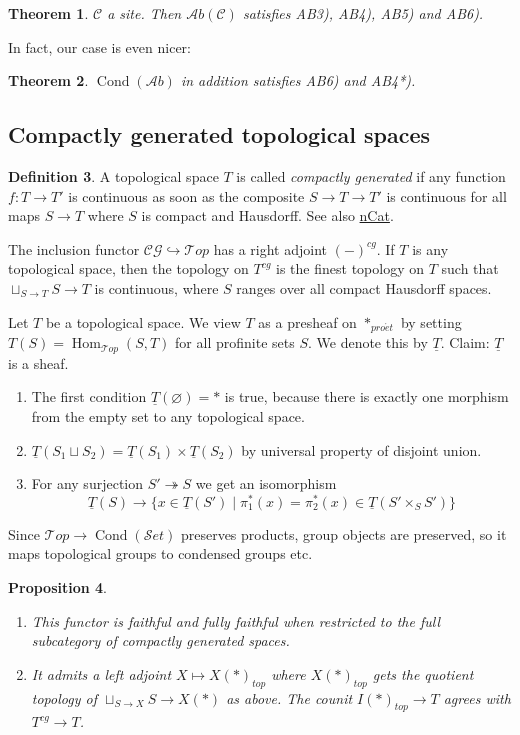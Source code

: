 \documentclass[11pt,A4]{article}
\theoremstyle{plain}
\newtheorem{thm}{Theorem}[section]
\newtheorem{prop}[thm]{Proposition}
\theoremstyle{definition}
\newtheorem{defn}[thm]{Definition}
\theoremstyle{remark}
\newcommand{\1}{\mathbbm{1}}
\newcommand{\scrC}{\mathscr{C}}
\newcommand{\Top}{\mathscr{T}op}
\newcommand{\CG}{\mathscr{CG}}
\newcommand{\Ab}{\mathscr{A}b}
\newcommand{\Set}{\mathscr{S}et}
\DeclareMathOperator{\Hom}{Hom}
\DeclareMathOperator{\Cond}{Cond}
\newcommand{\pe}{*_{pro\acute et}}
\renewcommand{\u}[1]{\underline{#1}}
\newcommand{\fp}[1]{\times_{#1}}
\begin{document}
\begin{thm}
    $\scrC$ a site. Then $\Ab(\scrC)$ satisfies AB3), AB4), AB5) and AB6).
\end{thm}

In fact, our case is even nicer:

\begin{thm}
    $\Cond(\Ab)$ in addition satisfies AB6) and AB4*).
\end{thm}

\subsection{Compactly generated topological spaces}

\begin{defn}
    A topological space $T$ is called \textit{compactly generated} if any function $f\colon T\to T'$ is continuous as soon as the composite $S\to T\to T'$ is continuous for all maps $S\to T$ where $S$ is compact and Hausdorff.
    See also \href{https://ncatlab.org/nlab/show/compactly+generated+topological+space}{nCat}.
\end{defn}

The inclusion functor $\CG \hookrightarrow \Top$ has a right adjoint $(-)^{cg}$.
If $T$ is any topological space, then the topology on $T^{cg}$ is the finest topology on $T$ such that $\sqcup_{S\to T}S\to T$ is continuous, where $S$ ranges over all compact Hausdorff spaces.

Let $T$ be a topological space.
We view $T$ as a presheaf on $\pe$ by setting $T(S)=\Hom_{\Top}(S,T)$ for all profinite sets $S$.
We denote this by $\u{T}$.
Claim: $\u{T}$ is a sheaf.
\begin{enumerate}[label=\roman*)]
    \item The first condition $\u{T}(\varnothing)=*$ is true, because there is exactly one morphism from the empty set to any topological space.
    \item $\u{T}(S_{1}\sqcup S_{2})=\u{T}(S_{1})\times \u{T}(S_{2})$ by universal property of disjoint union.
    \item For any surjection $S'\twoheadrightarrow S$ we get an isomorphism
	\[ \u{T}(S)\to \{ x\in \u{T}(S')\mid \pi_{1}^{*}(x)=\pi_{2}^{*}(x)\in \u{T}(S'\fp{S}S')\}\]
\end{enumerate}

Since $\Top\to \Cond(\Set)$ preserves products, group objects are preserved, so it maps topological groups to condensed groups etc.

\begin{prop}
    \begin{enumerate}[label=\roman*)]
	\item This functor is faithful and fully faithful when restricted to the full subcategory of compactly generated spaces.
	\item It admits a left adjoint $X\mapsto X(*)_{top}$ where $X(*)_{top}$ gets the quotient topology of $\sqcup_{S\to X}S\to X(*)$ as above.
	    The counit $I(*)_{top}\to T$ agrees with $T^{cg}\to T$.
    \end{enumerate}
\end{prop}
\end{document}
